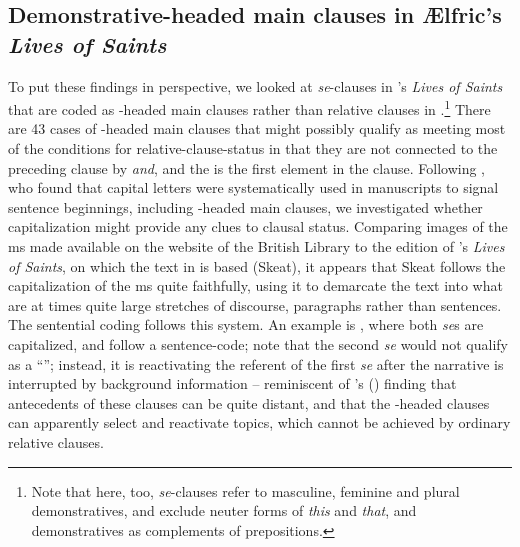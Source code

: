 \documentclass[output=paper,colorlinks,citecolor=brown]{langscibook}
\begin{document}
\subsection{Demonstrative-headed main clauses in Ælfric's \textit{Lives of Saints}} \label{sec:los:5.2}
To put these findings in perspective, we looked at \textit{se}{}-clauses in 's \textit{Lives of Saints} that are coded as -headed main clauses rather than relative clauses in .\footnote{Note that here, too, \textit{se}{}-clauses refer to masculine, feminine and plural demonstratives, and exclude neuter forms of \textit{this} and \textit{that}, and demonstratives as complements of prepositions.} There are 43 cases of -headed main clauses that might possibly qualify as meeting most of the conditions for relative-clause-status in that they are not connected to the preceding clause by \textit{and}, and the  is the first element in the clause. Following \citet{Schlachter2012}, who found that capital letters were systematically used in  manuscripts to signal sentence beginnings, including -headed main clauses, we investigated whether capitalization might provide any clues to clausal status. Comparing images of the ms made available on the website of the British Library to the edition of 's \textit{Lives of Saints}, on which the text in  is based (Skeat), it appears that Skeat follows the capitalization of the ms quite faithfully, using it to demarcate the text into what are at times quite large stretches of discourse, paragraphs rather than sentences. The  sentential coding follows this system. An example is , where both \textit{se}s are capitalized, and follow a sentence-code; note that the second \textit{se} would not qualify as a “”; instead, it is reactivating the referent of the first \textit{se} after the narrative is interrupted by background information – reminiscent of \citeauthor{Schlachter2012}'s (\citeyear{Schlachter2012}) finding that antecedents of these clauses can be quite distant, and that the -headed clauses can apparently select and reactivate topics, which cannot be achieved by ordinary relative clauses.
\end{document}
